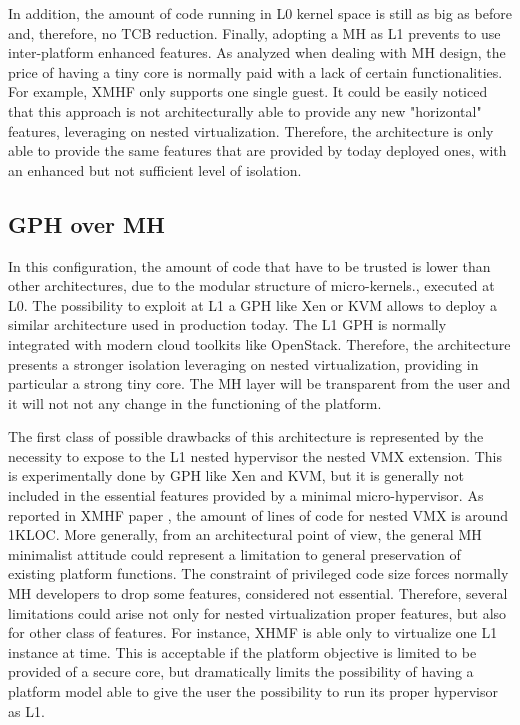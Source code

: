 \documentclass{acm_proc_article-sp} %
\begin{document}
In addition, the amount of code running in L0 kernel space is still as big as before and, therefore, no TCB reduction. 
Finally, adopting a MH as L1 prevents to use inter-platform enhanced features. As analyzed when dealing with MH design, the price of having a tiny core is normally paid with a lack of certain functionalities. For example, XMHF only supports one single guest. It could be easily noticed that this approach is not architecturally able to provide any new "horizontal" features, leveraging on nested virtualization. Therefore, the architecture is only able to provide the same features that are provided by today deployed ones, with an enhanced but not sufficient level of isolation.

\subsection{GPH over MH}
\label{par:gom}

In this configuration, the amount of code that have to be trusted is lower than other architectures, due to the modular structure of micro-kernels., executed at L0.
The possibility to exploit at L1 a GPH like Xen or KVM allows to deploy a similar architecture used in production today. The L1 GPH is normally integrated with modern cloud toolkits like OpenStack.
Therefore, the architecture presents a stronger isolation leveraging on nested virtualization, providing in particular a strong tiny core. The MH layer will be transparent from the user and it will not not any change in the functioning of the platform.

The first class of possible drawbacks of this architecture is represented by the necessity to expose to the L1 nested hypervisor the nested VMX extension.  This is experimentally done by GPH like Xen and KVM, but it is generally not included in the essential features provided by a minimal micro-hypervisor. As reported in XMHF paper \cite{xmhf}, the amount of lines of code for nested VMX is around 1KLOC. 
More generally, from an architectural point of view, the general MH minimalist attitude could represent a limitation to general preservation of existing platform functions. The constraint of privileged code size forces normally MH developers to drop some features, considered not essential. Therefore, several limitations could arise not only for nested virtualization proper features, but also for other class of features. For instance, XHMF is able only to virtualize one L1 instance at time. This is acceptable if the platform objective is limited to be provided of a secure core, but dramatically limits the possibility of having a platform model able to give the user the possibility to run its proper hypervisor as L1.
\end{document}

